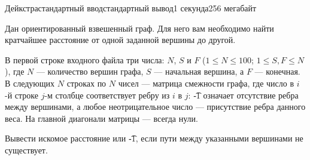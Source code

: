 \begin{problem}{Дейкстра}{стандартный ввод}{стандартный вывод}{1 секунда}{256 мегабайт}

Дан ориентированный взвешенный граф. Для него вам необходимо найти кратчайшее расстояние от одной заданной вершины до другой.

\InputFile
В первой строке входного файла три числа: $N$, $S$ и $F$ ($1 \le N \le 100$; $1 \le S, F \le N$), где $N$ --- количество вершин графа, $S$ --- начальная вершина, а $F$ --- конечная. В следующих $N$ строках по $N$ чисел --- матрица смежности графа, где число в $i$-й строке $j$-м столбце соответствует ребру из $i$ в $j$: \t{-1} означает отсутствие ребра между вершинами, а любое неотрицательное число --- присутствие ребра данного веса. На главной диагонали матрицы --- всегда нули. 


\OutputFile
Вывести искомое расстояние или \t{-1}, если пути между указанными вершинами не существует. 

\Example

\begin{example}
%
\end{example}

\end{problem}

